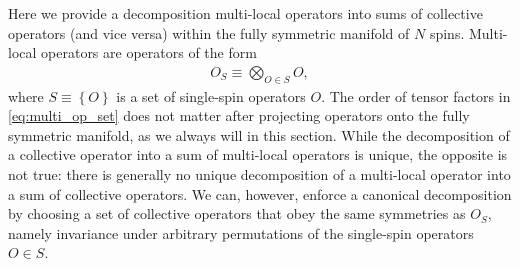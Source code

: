 \documentclass[nofootinbib,notitlepage,11pt]{revtex4-2}
\renewcommand{\set}[1]{\left\{#1\right\}} %
\newcommand{\1}{\mathds{1}}
\begin{document}
Here we provide a decomposition multi-local operators into sums of
collective operators (and vice versa) within the fully symmetric
manifold of $N$ spins.  Multi-local operators are operators of the
form
\begin{align}
  O_S \equiv \bigotimes_{O\in S} O,
  \label{eq:multi_op_set}
\end{align}
where $S\equiv\set{O}$ is a set of single-spin operators $O$.  The
order of tensor factors in \eqref{eq:multi_op_set} does not matter
after projecting operators onto the fully symmetric manifold, as we
always will in this section.  While the decomposition of a collective
operator into a sum of multi-local operators is unique, the opposite
is not true: there is generally no unique decomposition of a
multi-local operator into a sum of collective operators.  We can,
however, enforce a canonical decomposition by choosing a set of
collective operators that obey the same symmetries as $O_S$, namely
invariance under arbitrary permutations of the single-spin operators
$O\in S$.
\end{document}

